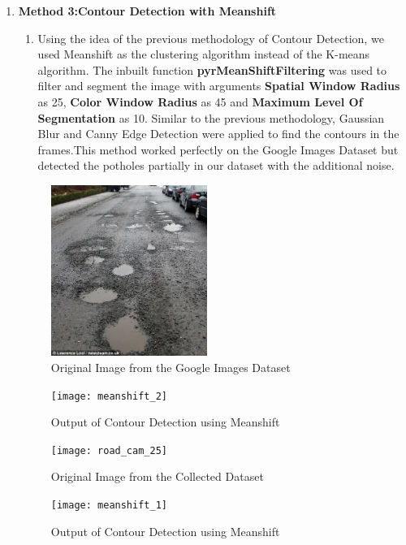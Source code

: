 \documentclass[12pt,a4paper]{article}
\begin{document}
\begin{enumerate}
\begin{enumerate}
    \item \textbf{Method 3:Contour Detection with Meanshift}
    \begin{enumerate}
        \item Using the idea of the previous methodology of Contour Detection, we used Meanshift as the clustering algorithm instead of the K-means algorithm. The inbuilt function \textbf{pyrMeanShiftFiltering} was used to filter and segment the image with arguments \textbf{Spatial Window Radius} as 25, \textbf{Color Window Radius} as 45 and \textbf{Maximum Level Of Segmentation} as 10. Similar to the previous methodology, Gaussian Blur and Canny Edge Detection were applied to find the contours in the frames.This method worked perfectly on the Google Images Dataset but detected the potholes partially in our dataset with the additional noise.
    \end{enumerate}
    \pagebreak
    
    \begin{figure}[ht!]
        \centering
        \includegraphics[width = 2in]{road_10}
        \caption{Original Image from the Google Images Dataset}
    \end{figure}

    \begin{figure}[ht!]
        \centering
        \texttt{[image: meanshift\_2]}
        \caption{Output of Contour Detection using Meanshift}
    \end{figure}
    \pagebreak
    
    \begin{figure}[ht!]
        \centering
        \texttt{[image: road\_cam\_25]}
        \caption{Original Image from the Collected Dataset}
    \end{figure}

    \begin{figure}[ht!]
        \centering
        \texttt{[image: meanshift\_1]}
        \caption{Output of Contour Detection using Meanshift}
    \end{figure}
    \pagebreak


\end{enumerate}
\end{enumerate}
\end{document}
